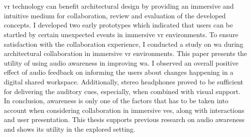 \chapter{\abstractname}

\gls{vr} technology can benefit architectural design by providing an immersive and intuitive medium for collaboration, review and evaluation of the developed concepts.
I developed two early prototypes which indicated that users can be startled by certain unexpected events in immersive \gls{vr} environments.
To ensure satisfaction with the collaboration experience, I conducted a study on \gls{wa} during architectural collaboration in immersive \gls{vr} environments.
This paper presents the utility of using audio awareness in improving \gls{wa}.
I observed an overall positive effect of audio feedback on informing the users about changes happening in a digital shared workspace. Additionally, stereo headphones proved to be sufficient for delivering the auditory cues, especially, when combined with visual support.
In conclusion, awareness is only one of the factors that has to be taken into account when considering collaboration in immersive \glspl{ve}, along with interactions and user presentation.
This thesis supports previous research on audio awareness and shows its utility in the explored setting.

\begin{comment}
However, this immersiveness in combination with the inherently limited perceptual information available in \glspl{ve} creates a bizarre situation, where on one hand, the visual information is very convincing, but on the other, the familiar perceptual feedbacks from the environment and our own actions are stripped away.
Starting with the question of how this situation affects the satisfaction with collaboration experience, I arrive at the concept of \gls{wa}. I build upon the design of a previous study on \gls{wa} from the field of \gls{cscw} and adapt it into a study of architectural collaboration in an immersive \gls{vr} environment. 
The results of the conducted experiments support previous research and show the high benefit of using additional audio feedback to support \gls{wa}.
\end{comment}

